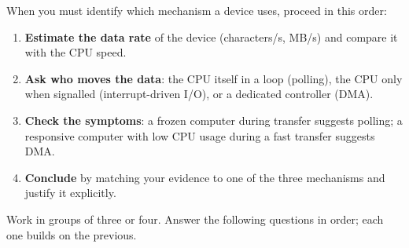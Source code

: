 \documentclass[11pt]{article}
\newcounter{popsec}
\newcounter{popsub}
\newcommand{\courssub}[1]{%
  \stepcounter{popsub}%
  \par\vspace{9pt}\noindent{\popxbold\fontsize{11.5}{13}\selectfont\color{popink}{\color{poporange}\thepopsec.\thepopsub}\hspace{6pt}#1}\par\nopagebreak\vspace{4pt}
}
\begin{document}
\begin{methode}
When you must identify which mechanism a device uses, proceed in this order:
\begin{enumerate}
\item \textbf{Estimate the data rate} of the device (characters/s, MB/s) and compare it with the CPU speed.
\item \textbf{Ask who moves the data}: the CPU itself in a loop (polling), the CPU only when signalled (interrupt-driven I/O), or a dedicated controller (DMA).
\item \textbf{Check the symptoms}: a frozen computer during transfer suggests polling; a responsive computer with low CPU usage during a fast transfer suggests DMA.
\item \textbf{Conclude} by matching your evidence to one of the three mechanisms and justify it explicitly.
\end{enumerate}
\end{methode}

\courssub{Tasks}

Work in groups of three or four. Answer the following questions in order; each one builds on the previous.
\end{document}
